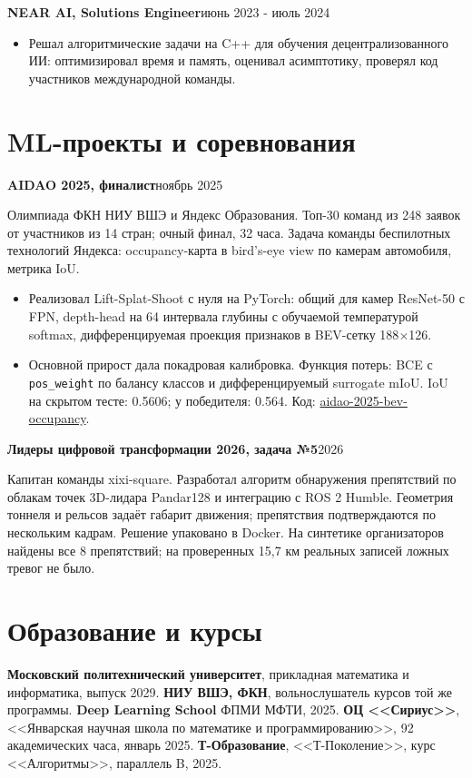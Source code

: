 \documentclass[10pt,a4paper]{article}
\newcommand{\role}[2]{\textbf{#1}\hfill #2\par}
\begin{document}
\role{NEAR AI, Solutions Engineer}{июнь 2023 - июль 2024}
\begin{itemize}
  \item Решал алгоритмические задачи на C++ для обучения децентрализованного ИИ:
        оптимизировал время и память, оценивал асимптотику, проверял код участников международной команды.
\end{itemize}

\section{ML-проекты и соревнования}
\role{AIDAO 2025, финалист}{ноябрь 2025}
Олимпиада ФКН НИУ ВШЭ и Яндекс Образования. Топ-30 команд из 248 заявок от участников
из 14 стран; очный финал, 32 часа. Задача команды беспилотных технологий Яндекса:
occupancy-карта в bird's-eye view по камерам автомобиля, метрика IoU.
\begin{itemize}
  \item Реализовал Lift-Splat-Shoot с нуля на PyTorch: общий для камер ResNet-50 с FPN,
        depth-head на 64 интервала глубины с обучаемой температурой softmax,
        дифференцируемая проекция признаков в BEV-сетку 188$\times$126.
  \item Основной прирост дала покадровая калибровка. Функция потерь: BCE с
        \texttt{pos\_weight} по балансу классов и дифференцируемый surrogate mIoU.
        IoU на скрытом тесте: 0.5606; у победителя: 0.564.
        Код: \href{https://github.com/iluuua/aidao-2025-bev-occupancy}{aidao-2025-bev-occupancy}.
\end{itemize}

\role{Лидеры цифровой трансформации 2026, задача №5}{2026}
Капитан команды xixi-square. Разработал алгоритм обнаружения препятствий по облакам точек
3D-лидара Pandar128 и интеграцию с ROS 2 Humble. Геометрия тоннеля и рельсов задаёт габарит
движения; препятствия подтверждаются по нескольким кадрам. Решение упаковано в Docker.
На синтетике организаторов найдены все 8 препятствий; на проверенных 15,7 км реальных записей
ложных тревог не было.

\section{Образование и курсы}
\textbf{Московский политехнический университет}, прикладная математика и информатика, выпуск 2029.
\textbf{НИУ ВШЭ, ФКН}, вольнослушатель курсов той же программы.
\textbf{Deep Learning School} ФПМИ МФТИ, 2025.
\textbf{ОЦ <<Сириус>>}, <<Январская научная школа по математике и программированию>>,
92 академических часа, январь 2025.
\textbf{Т-Образование}, <<Т-Поколение>>, курс <<Алгоритмы>>, параллель B, 2025.
\end{document}
